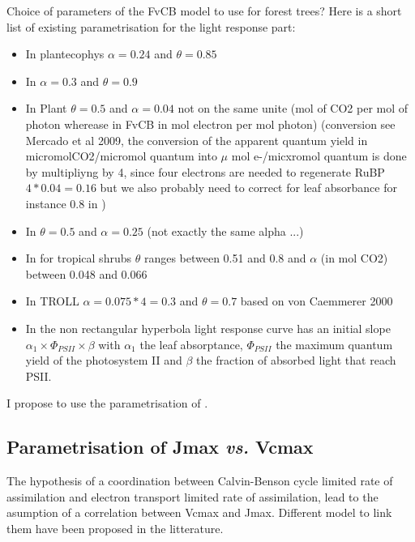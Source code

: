 \documentclass[a4paper,11pt]{article}
\begin{document}
Choice of parameters of the FvCB model to use for
forest trees? Here is a short list of existing parametrisation for the
light response part:
\begin{itemize}

\item In plantecophys \citep{Duursma-2015}  $\alpha = 0.24$ and $\theta = 0.85$

\item In \citet{Medlyn-2002} $\alpha = 0.3$ and $\theta = 0.9$

\item In Plant $\theta = 0.5$ and $\alpha= 0.04$ not on the same unite
  (mol of CO2 per mol of photon wherease in FvCB in mol electron per
  mol photon)  (conversion see Mercado et al 2009, the conversion of
  the apparent quantum yield in micromolCO2/micromol quantum into
  $\mu$ mol e-/micxromol quantum is done by multipliyng by 4, since
  four electrons are needed to regenerate RuBP $4*0.04 = 0.16$ but we
  also probably need to correct for leaf absorbance for instance 0.8 in \citet{Medlyn-2002})

\item In \citet{Sterck-2011} $\theta = 0.5$ and $\alpha = 0.25$ (not exactly the same alpha ...)

\item  In \citet{Valladares-1997} for tropical shrubs $\theta$ ranges between 0.51 and 0.8 and $\alpha$ (in mol CO2) between 0.048 and 0.066

\item In TROLL \citet{Marechaux-2017} $\alpha = 0.075*4 = 0.3$ and $\theta = 0.7$ based on von Caemmerer 2000

\item In \citet{vonCaemmerer-2000} the non rectangular hyperbola light response curve has an initial slope $\alpha_1 \times \Phi_{PSII} \times \beta$ with $\alpha_1$ the leaf absorptance, $\Phi_{PSII}$ the maximum quantum yield of the photosystem II and $\beta$ the fraction of absorbed light that reach PSII.

\end{itemize}

I propose to use the parametrisation of \citet{Marechaux-2017}.


\subsection{Parametrisation of Jmax \textit{vs.} Vcmax}

The hypothesis of a coordination between Calvin-Benson cycle limited
rate of assimilation and electron transport limited rate of
assimilation, lead to the asumption of a correlation between Vcmax and
Jmax. Different model to link them have been proposed in the
litterature.
\end{document}
